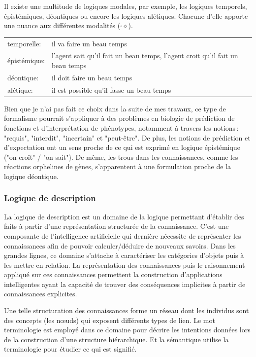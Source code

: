 \begin{refsegment}
    Il existe une multitude de logiques modales, par exemple, les logiques temporels, épistémiques, déontiques ou encore les logiques alétiques. Chacune d'elle apporte une nuance aux différentes modalités ($\square \diamond$).
    
    \begin{tabular}{ll}
        temporelle:    & il va faire un beau temps \\
        épistémique:   & l'agent sait qu'il fait un beau temps,  l'agent croit qu'il fait un beau temps \\
        déontique:     & il doit faire un beau temps \\
        alétique:      & il est possible qu'il fasse un beau temps \\
    \end{tabular}

    Bien que je n'ai pas fait ce choix dans la suite  de mes travaux, ce type de formalisme pourrait s'appliquer à des problèmes en biologie de prédiction de fonctions et d'interprétation de phénotypes, notamment à travers les notions : "requis", "interdit", "incertain" et "peut-être".  De plus, les notions de prédiction et d'expectation ont un sens proche de ce qui est exprimé en logique épistémique ("on croît" / "on sait"). De même, les trous dans les connaissances, comme les réactions orphelines de gènes, s'apparentent à  une formulation proche de la logique déontique.
    
    
    
    \subsubsection{Logique de description}
    
    La logique de description est un domaine de la logique permettant d'établir des faits à partir d'une représentation structurée de la connaissance. C'est une composante de l'intelligence artificielle qui dernière nécessite de représenter les connaissances afin de pouvoir calculer/déduire de nouveaux savoirs. Dans les grandes lignes, ce domaine s'attache à caractériser les catégories d'objets puis à les mettre en relation. La représentation des connaissances puis le raisonnement appliqué sur ces connaissances permettent la construction d'applications intelligentes ayant la capacité de trouver des conséquences implicites à partir de connaissances explicites.
    
    Une telle structuration des connaissances forme un réseau dont les individus sont des concepts (les nœuds) qui exposent différents types de lien. Le mot terminologie est employé dans ce domaine pour décrire les intentions données lors de la construction d'une structure hiérarchique. Et la sémantique utilise la terminologie pour étudier ce qui est signifié.
    

\end{refsegment}
